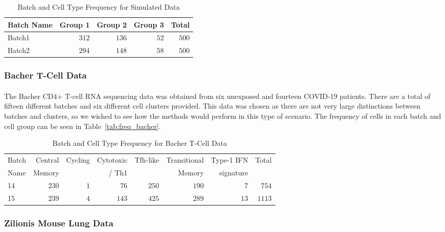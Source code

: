 \documentclass[
12pt, %
letterpaper, %
oneside, %
headinclude,footinclude, %
BCOR5mm, %
]{scrartcl}
\begin{document}
\begin{table}[ht]
    \caption{Batch and Cell Type Frequency for Simulated Data}
    \centering
    \begin{tabular}{lrrrr}
    \toprule
    Batch Name & Group 1 & Group 2 & Group 3 & Total \\
    \midrule
    Batch1 & $312$ & $136$ & $52$ & $500$ \\
    Batch2 & $294$ & $148$ & $58$ & $500$ \\
    \bottomrule
    \end{tabular}
    \label{tab:freq_simdata}
\end{table}

\subsubsection*{Bacher T-Cell Data}

\paragraph*{}
The Bacher CD4+ T-cell RNA sequencing data \citep{bacher2020low} was obtained from six unexposed and fourteen COVID-19 patients. There are a total of fifteen different batches and six different cell clusters provided. This data was chosen as there are not very large distinctions between batches and clusters, so we wished to see how the methods would perform in this type of scenario. The frequency of cells in each batch and cell group can be seen in Table~\vref{tab:freq_bacher}.

\begin{table}[ht]
    \caption{Batch and Cell Type Frequency for Bacher T-Cell Data}
    \centering
    \begin{tabular}{lrrrrrrr}
    \toprule
    Batch & Central  & Cycling & Cytotoxic & Tfh-like & Transitional & Type-1 IFN  & Total \\
    Name  & Memory   &         &  / Th1    &          & Memory       & signature   &       \\
    \midrule
    14 & $230$ & $1$ &  $76$ & $250$ & $190$ &  $7$ &  $754$ \\
    15 & $239$ & $4$ & $143$ & $425$ & $289$ & $13$ & $1113$ \\
    \bottomrule
    \end{tabular}
    \label{tab:freq_bacher}
\end{table}

\subsubsection*{Zilionis Mouse Lung Data}
\end{document}
